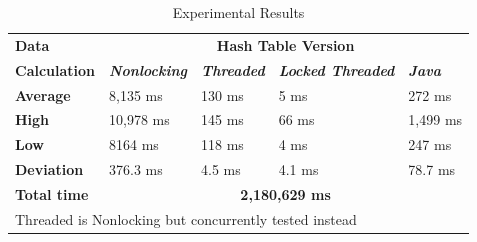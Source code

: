 \documentclass[conference]{IEEEtran}
\begin{document}
\begin{table}[htbp]
    \caption{Experimental Results}
    \begin{center}
    \begin{tabularx}{\columnwidth}{|X|X|X|X|X|}
    \hline
    \textbf{Data}&\multicolumn{4}{|c|}{\textbf{Hash Table Version}} \\
    \cline{2-5} 
    \textbf{Calculation} & \textbf{\textit{Nonlocking}}& \textbf{\textit{Threaded}}& \textbf{\textit{Locked Threaded}}& \textbf{\textit{Java}} \\
    \hline
    \textbf{Average}& 8,135 ms& 130 ms&  5 ms& 272 ms\\
    \hline
    \textbf{High}& 10,978 ms& 145 ms&  66 ms& 1,499 ms\\
    \hline
    \textbf{Low}& 8164 ms& 118 ms&  4 ms& 247 ms\\
    \hline
    \textbf{Deviation}& 376.3 ms& 4.5 ms&  4.1 ms& 78.7 ms\\
    \hline
    \textbf{Total time}&\multicolumn{4}{|c|}{\textbf{2,180,629 ms}} \\
    \hline
    \multicolumn{5}{l}{Threaded is Nonlocking but concurrently tested instead}
    \end{tabularx}
    \label{tab1}
    \end{center}
\end{table}
\end{document}
